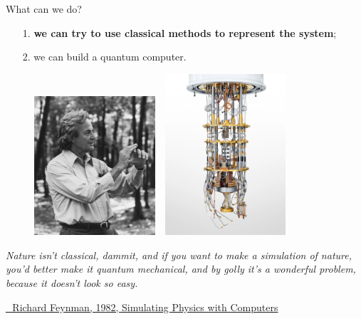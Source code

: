 \documentclass[8pt, xcolor={svgnames}, hyperref={linkcolor=black}]{beamer}
\begin{document}
\begin{frame}{What can we do?}
\begin{itemize}[noitemsep]
\item[1.] \textbf{\textcolor{amethyst}{we can try to use classical methods to represent the system}};
\item[2.] we can build a quantum computer.
\end{itemize}
\begin{figure}
   \includegraphics[width=0.4\textwidth, height=0.55\textheight]{figures/feynmann.jpg}%
   $\,\,$ 
   \includegraphics[width=0.4\textwidth, height=0.55\textheight]{figures/qcomp.png}
\end{figure}

\small
\textit{Nature isn't classical, dammit, and if you want to make a simulation of nature, 
you'd better make it quantum mechanical, and by golly it's a wonderful problem, 
because it doesn't look so easy.} 

\href{https://link.springer.com/article/10.1007/BF02650179}{\faBook\,\, Richard Feynman, 1982, Simulating Physics with Computers}
\end{frame}
\end{document}
